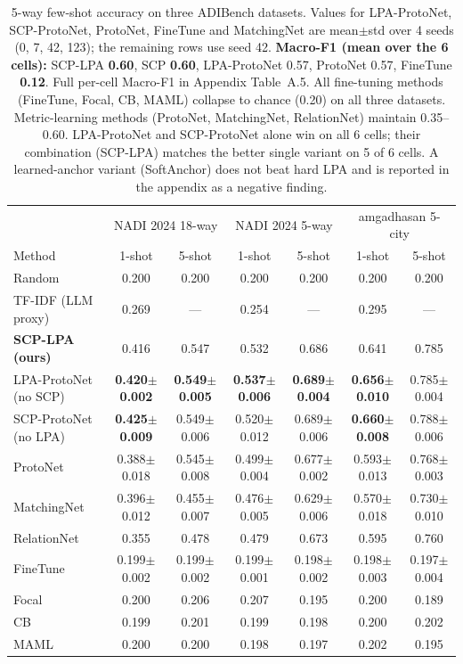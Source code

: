 \documentclass[11pt]{article}
\newcommand{\bench}{ADIBench}
\begin{document}
\begin{table}[t]
\centering\small
{\setlength{\tabcolsep}{4.5pt}
\begin{tabular}{lcccccc}
\toprule
& \multicolumn{2}{c}{NADI 2024 18-way} & \multicolumn{2}{c}{NADI 2024 5-way} & \multicolumn{2}{c}{amgadhasan 5-city} \\
\cmidrule(lr){2-3} \cmidrule(lr){4-5} \cmidrule(lr){6-7}
Method & 1-shot & 5-shot & 1-shot & 5-shot & 1-shot & 5-shot \\
\midrule
Random & 0.200 & 0.200 & 0.200 & 0.200 & 0.200 & 0.200 \\
TF-IDF (LLM proxy) & 0.269 & --- & 0.254 & --- & 0.295 & --- \\
\midrule
\textbf{SCP-LPA (ours)} & 0.416 & 0.547 & 0.532 & 0.686 & 0.641 & 0.785 \\
\makecell[l]{LPA-ProtoNet\\ (no SCP)}  & \textbf{0.420$\pm$0.002} & \textbf{0.549$\pm$0.005} & \textbf{0.537$\pm$0.006} & \textbf{0.689$\pm$0.004} & \textbf{0.656$\pm$0.010} & 0.785$\pm$0.004 \\
\makecell[l]{SCP-ProtoNet\\ (no LPA)}  & \textbf{0.425$\pm$0.009} & 0.549$\pm$0.006 & 0.520$\pm$0.012 & 0.689$\pm$0.006 & \textbf{0.660$\pm$0.008} & 0.788$\pm$0.006 \\
ProtoNet     & 0.388$\pm$0.018 & 0.545$\pm$0.008 & 0.499$\pm$0.004 & 0.677$\pm$0.002 & 0.593$\pm$0.013 & 0.768$\pm$0.003 \\
MatchingNet  & 0.396$\pm$0.012 & 0.455$\pm$0.007 & 0.476$\pm$0.005 & 0.629$\pm$0.006 & 0.570$\pm$0.018 & 0.730$\pm$0.010 \\
RelationNet  & 0.355 & 0.478 & 0.479 & 0.673 & 0.595 & 0.760 \\
\midrule
FineTune     & 0.199$\pm$0.002 & 0.199$\pm$0.002 & 0.199$\pm$0.001 & 0.198$\pm$0.002 & 0.198$\pm$0.003 & 0.197$\pm$0.004 \\
Focal        & 0.200 & 0.206 & 0.207 & 0.195 & 0.200 & 0.189 \\
CB           & 0.199 & 0.201 & 0.199 & 0.198 & 0.200 & 0.202 \\
MAML         & 0.200 & 0.200 & 0.198 & 0.197 & 0.202 & 0.195 \\
\bottomrule
\end{tabular}
}
\caption{5-way few-shot accuracy on three \bench{} datasets.
Values for LPA-ProtoNet, SCP-ProtoNet, ProtoNet, FineTune and
MatchingNet are mean$\pm$std over 4 seeds (0, 7, 42, 123);
the remaining rows use seed 42. \textbf{Macro-F1 (mean over
the 6 cells):} SCP-LPA \textbf{0.60}, SCP \textbf{0.60},
LPA-ProtoNet 0.57, ProtoNet 0.57, FineTune \textbf{0.12}.
Full per-cell Macro-F1 in Appendix Table~A.5. All fine-tuning methods (FineTune, Focal, CB,
MAML) collapse to chance (0.20) on all three datasets.
Metric-learning methods (ProtoNet, MatchingNet, RelationNet)
maintain 0.35--0.60. LPA-ProtoNet and SCP-ProtoNet alone win on
all 6 cells; their combination (SCP-LPA) matches the better
single variant on 5 of 6 cells. A learned-anchor variant
(SoftAnchor) does not beat hard LPA and is reported in the
appendix as a negative finding.}
\label{tab:main}
\end{table}
\end{document}
